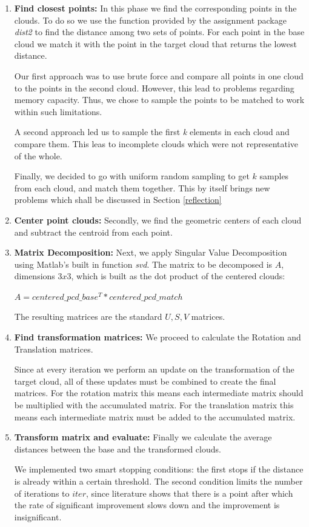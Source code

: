 \documentclass[11pt]{article}
\begin{document}
\begin{enumerate}
	\item \textbf{Find closest points:} In this phase we find the corresponding points in the clouds. To do so we use the function provided by the assignment package \textit{dist2} to find the distance among two sets of points. For each point in the base cloud we match it with the point in the target cloud that returns the lowest distance. 
	
	Our first approach was to use brute force and compare all points in one cloud to the points in the second cloud. However, this lead to problems regarding memory capacity. Thus, we chose to sample the points to be matched to work within such limitations.
	
	A second approach led us to sample the first \textit{k} elements in each cloud and compare them. This leas to incomplete clouds which were not representative of the whole.
	
	Finally, we decided to go with uniform random sampling to get $k$ samples from each cloud, and match them together. This by itself brings new problems which shall be discussed in Section \ref{reflection}
	
	\item \textbf{Center point clouds:} Secondly, we find the geometric centers of each cloud and subtract the centroid from each point. 
	
	\item \textbf{Matrix Decomposition:} Next, we apply Singular Value Decomposition using Matlab's built in function \textit{svd}. The matrix to be decomposed is $A$, dimensions $3 x 3$, which is built as the dot product of the centered clouds: 
	
	\begin{center}
		$A = centered\_pcd\_base^T * centered\_pcd\_match$
	\end{center}
	
	The resulting matrices are the standard $U, S, V$ matrices.	
	
	\item \textbf{Find transformation matrices:} We proceed to calculate the Rotation and Translation matrices. 
	
	Since at every iteration we perform an update on the transformation of the target cloud, all of these updates must be combined to create the final matrices. For the rotation matrix this means each intermediate matrix should be multiplied with the accumulated matrix. For the translation matrix this means each intermediate matrix must be added to the accumulated matrix.
	
	\item \textbf{Transform matrix and evaluate:} Finally we calculate the average distances between the base and the transformed clouds. 
	
	We implemented two smart stopping conditions: the first stops if the distance is already within a certain threshold. The second condition limits the number of iterations to $iter$, since literature shows that there is a point after which the rate of significant improvement slows down and the improvement is insignificant.
\end{enumerate}
\end{document}
